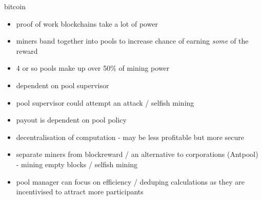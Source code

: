 bitcoin \cite{nakamoto2009}

\begin{itemize}
  \item proof of work blockchains take a lot of power 
  \item miners band together into pools to increase chance of earning \textit{some} of the reward
  \item 4 or so pools make up over 50\% of mining power 
  \item dependent on pool supervisor
  \item pool supervisor could attempt an attack / selfish mining
  \item payout is dependent on pool policy
\end{itemize}

\begin{itemize}
  \item decentralisation of computation - may be less profitable but more secure
  \item separate miners from blockreward / an alternative to corporations (Antpool) - mining empty blocks / selfish mining
  \item pool manager can focus on efficiency / deduping calculations as they are incentivised to attract more participants
\end{itemize}
